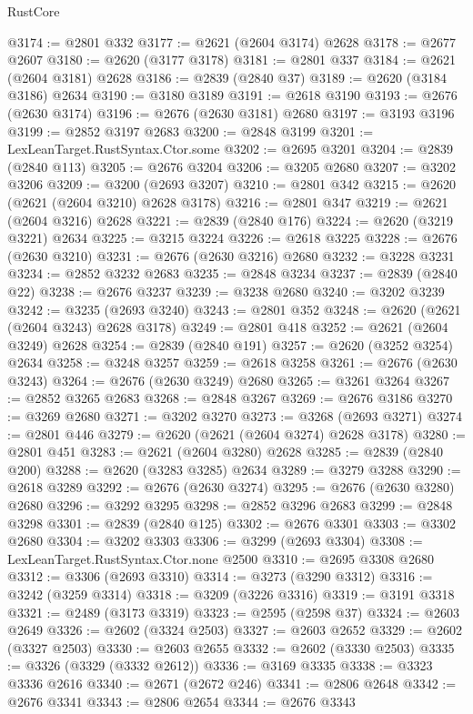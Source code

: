 \begin{lexlean}{RustCore}
\begin{coremodule}
@3174 := @2801 @332
@3177 := @2621 (@2604 @3174) @2628
@3178 := @2677 @2607
@3180 := @2620 (@3177 @3178)
@3181 := @2801 @337
@3184 := @2621 (@2604 @3181) @2628
@3186 := @2839 (@2840 @37)
@3189 := @2620 (@3184 @3186) @2634
@3190 := @3180 @3189
@3191 := @2618 @3190
@3193 := @2676 (@2630 @3174)
@3196 := @2676 (@2630 @3181) @2680
@3197 := @3193 @3196
@3199 := @2852 @3197 @2683
@3200 := @2848 @3199
@3201 := LexLeanTarget.RustSyntax.Ctor.some
@3202 := @2695 @3201
@3204 := @2839 (@2840 @113)
@3205 := @2676 @3204
@3206 := @3205 @2680
@3207 := @3202 @3206
@3209 := @3200 (@2693 @3207)
@3210 := @2801 @342
@3215 := @2620 (@2621 (@2604 @3210) @2628 @3178)
@3216 := @2801 @347
@3219 := @2621 (@2604 @3216) @2628
@3221 := @2839 (@2840 @176)
@3224 := @2620 (@3219 @3221) @2634
@3225 := @3215 @3224
@3226 := @2618 @3225
@3228 := @2676 (@2630 @3210)
@3231 := @2676 (@2630 @3216) @2680
@3232 := @3228 @3231
@3234 := @2852 @3232 @2683
@3235 := @2848 @3234
@3237 := @2839 (@2840 @22)
@3238 := @2676 @3237
@3239 := @3238 @2680
@3240 := @3202 @3239
@3242 := @3235 (@2693 @3240)
@3243 := @2801 @352
@3248 := @2620 (@2621 (@2604 @3243) @2628 @3178)
@3249 := @2801 @418
@3252 := @2621 (@2604 @3249) @2628
@3254 := @2839 (@2840 @191)
@3257 := @2620 (@3252 @3254) @2634
@3258 := @3248 @3257
@3259 := @2618 @3258
@3261 := @2676 (@2630 @3243)
@3264 := @2676 (@2630 @3249) @2680
@3265 := @3261 @3264
@3267 := @2852 @3265 @2683
@3268 := @2848 @3267
@3269 := @2676 @3186
@3270 := @3269 @2680
@3271 := @3202 @3270
@3273 := @3268 (@2693 @3271)
@3274 := @2801 @446
@3279 := @2620 (@2621 (@2604 @3274) @2628 @3178)
@3280 := @2801 @451
@3283 := @2621 (@2604 @3280) @2628
@3285 := @2839 (@2840 @200)
@3288 := @2620 (@3283 @3285) @2634
@3289 := @3279 @3288
@3290 := @2618 @3289
@3292 := @2676 (@2630 @3274)
@3295 := @2676 (@2630 @3280) @2680
@3296 := @3292 @3295
@3298 := @2852 @3296 @2683
@3299 := @2848 @3298
@3301 := @2839 (@2840 @125)
@3302 := @2676 @3301
@3303 := @3302 @2680
@3304 := @3202 @3303
@3306 := @3299 (@2693 @3304)
@3308 := LexLeanTarget.RustSyntax.Ctor.none @2500
@3310 := @2695 @3308 @2680
@3312 := @3306 (@2693 @3310)
@3314 := @3273 (@3290 @3312)
@3316 := @3242 (@3259 @3314)
@3318 := @3209 (@3226 @3316)
@3319 := @3191 @3318
@3321 := @2489 (@3173 @3319)
@3323 := @2595 (@2598 @37)
@3324 := @2603 @2649
@3326 := @2602 (@3324 @2503)
@3327 := @2603 @2652
@3329 := @2602 (@3327 @2503)
@3330 := @2603 @2655
@3332 := @2602 (@3330 @2503)
@3335 := @3326 (@3329 (@3332 @2612))
@3336 := @3169 @3335
@3338 := @3323 @3336 @2616
@3340 := @2671 (@2672 @246)
@3341 := @2806 @2648
@3342 := @2676 @3341
@3343 := @2806 @2654
@3344 := @2676 @3343

\end{coremodule}
\end{lexlean}

